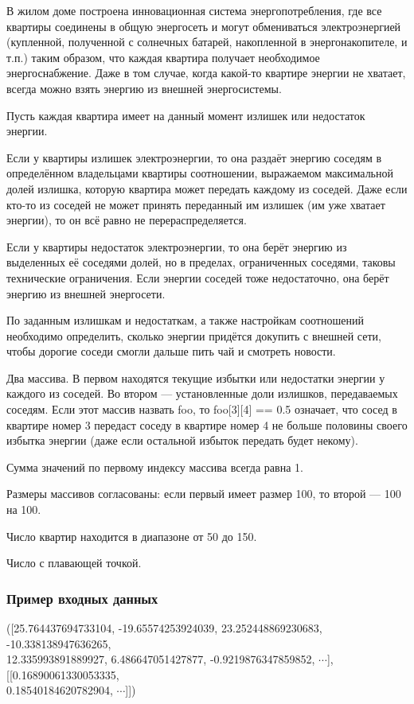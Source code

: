 
В жилом доме построена инновационная система энергопотребления, где все квартиры соединены в 
общую энергосеть и могут обмениваться электроэнергией (купленной, полученной с солнечных батарей, 
накопленной в энергонакопителе, \linebreak и т.п.) таким образом, что каждая квартира получает необходимое энергоснабжение. Даже в том случае, когда какой-то квартире энергии не хватает, всегда можно взять энергию из внешней энергосистемы.

Пусть каждая квартира имеет на данный момент излишек или недостаток энергии.

Если у квартиры излишек электроэнергии, то она раздаёт энергию соседям в определённом владельцами квартиры соотношении, выражаемом максимальной долей излишка, которую квартира может передать каждому из соседей. Даже если кто-то из соседей не может принять переданный им излишек (им уже хватает энергии), то он всё равно не перераспределяется.

Если у квартиры недостаток электроэнергии, то она берёт энергию из выделенных её соседями долей, но в пределах, ограниченных соседями, таковы технические ограничения. Если энергии соседей тоже недостаточно, она берёт энергию из внешней энергосети.

По заданным излишкам и недостаткам, а также настройкам соотношений необходимо определить, сколько энергии придётся докупить с внешней сети, чтобы дорогие соседи смогли дальше пить чай и смотреть новости.


Два массива. В первом находятся текущие избытки или недостатки энергии у каждого из соседей. Во втором — установленные доли излишков, передаваемых соседям. Если этот массив назвать foo, то foo[3][4] == 0.5 означает, что сосед в квартире номер 3 передаст соседу в квартире номер 4 не больше половины своего избытка энергии (даже если остальной избыток передать будет некому).

Сумма значений по первому индексу массива всегда равна 1.

Размеры массивов согласованы: если первый имеет размер 100, то второй — 100 на 100.

Число квартир находится в диапазоне от 50 до 150.

\outputfmtSection

Число с плавающей точкой.

\subsubsection*{Пример входных данных}
\noindent([25.764437694733104, -19.65574253924039, 23.252448869230683, -10.338138947636265, \\
12.335993891889927, 6.486647051427877, -0.9219876347859852, $\cdots$], [[0.16890061330053335, \\
0.18540184620782904, $\cdots$]])

